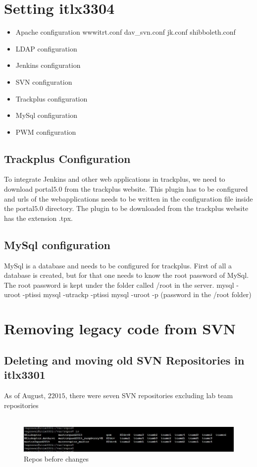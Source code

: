 	
\chapter{Setting itlx3304}


\begin{itemize}
 \item Apache configuration
 \subitem wwwitrt.conf
 \subitem dav\_svn.conf
 \subitem jk.conf
 \subitem shibboleth.conf
 \item LDAP configuration
 \item Jenkins configuration
 \item SVN configuration
 \item Trackplus configuration
 \item MySql configuration
 \item PWM configuration
\end{itemize}

\section{Trackplus Configuration}
To integrate Jenkins and other web applications in trackplus, we need to
download portal$5.0$ from the trackplus website. This plugin has to be
configured and urls of the webapplications needs to be written in the
configuration file inside the portal$5.0$ directory.
The plugin to be downloaded from the trackplus website has the extension .tpx.
 
\section{MySql configuration}
MySql is a database and needs to be configured for trackplus. First of all a
database is created, but for that one needs to know the root password of MySql.
The root password is kept under the folder called /root in the server.
mysql -uroot -ptissi
mysql -utrackp -ptissi
mysql -uroot -p (password in the /root folder)


\chapter{Removing legacy code from SVN}
\section{Deleting and
moving old SVN Repositories in itlx3301}As of August, $22015$, there were seven
SVN repositories excluding lab team repositories\\\\
\begin{figure}[H]
\begin{center}
		\includegraphics[width=1.0\textwidth]{images/svn_repos_before.jpg} 
		\caption{Repos before changes}
	\label{fig:SVNBefore}
\end{center}
\end{figure}

